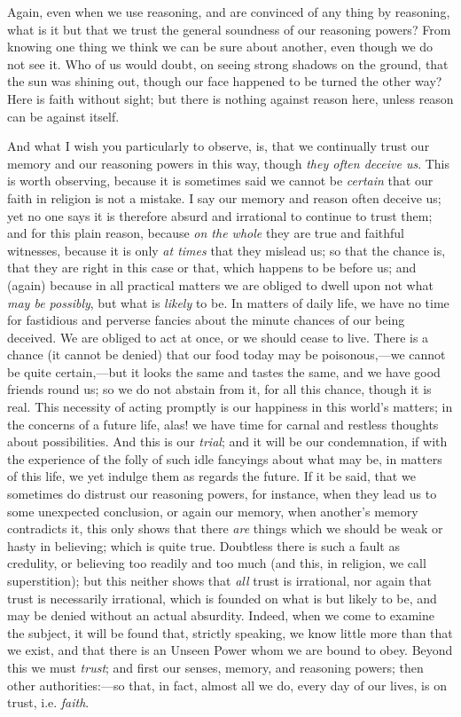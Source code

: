Again, even when we use reasoning, and are convinced
of any thing by reasoning, what is it but that we trust the general soundness of our reasoning powers? From
knowing one thing we think we can be sure about another,
even though we do not see it. Who of us would doubt, on
seeing strong shadows on the ground, that the sun was
shining out, though our face happened to be turned the
other way? Here is faith without sight; but there is
nothing against reason here, unless reason can be against
itself.

And what I wish you particularly to observe, is, that
we continually trust our memory and our reasoning powers
in this way, though \emph{they often deceive us}. This is
worth observing, because it is sometimes said we cannot
be \emph{certain} that our faith in religion is not a
mistake. I say our memory and reason often deceive us;
yet no one says it is therefore absurd and irrational to
continue to trust them; and for this plain reason,
because \emph{on the whole} they are true and faithful
witnesses, because it is only \emph{at times} that they
mislead us; so that the chance is, that they are right in
this case or that, which happens to be before us; and
(again) because in all practical matters we are obliged
to dwell upon not what \emph{may be possibly}, but what
is \emph{likely} to be. In matters of daily life, we have
no time for fastidious and perverse fancies about the
minute chances of our being deceived. We are obliged to
act at once, or we should cease to live. There is a
chance (it cannot be denied) that our food today may be
poisonous,—we cannot be quite certain,—but it
looks the same and tastes the same, and we have good
friends round us; so we do not abstain from it, for all
this chance, though it is real. This necessity of acting
promptly is our happiness in this world's matters; in the
concerns of a future life, alas! we have time for carnal
and restless thoughts about possibilities. And this is
our \emph{trial}; and it will be our condemnation, if
with the experience of the folly of such idle fancyings
about what may be, in matters of this life, we yet
indulge them as regards the future. If it be said, that
we sometimes do distrust our reasoning powers, for
instance, when they lead us to some unexpected
conclusion, or again our memory, when another's memory
contradicts it, this only shows that there \emph{are}
things which we should be weak or hasty in believing;
which is quite true. Doubtless there is such a fault as
credulity, or believing too readily and too much (and
this, in religion, we call superstition); but this
neither shows that \emph{all} trust is irrational, nor
again that trust is necessarily irrational, which is
founded on what is but likely to be, and may be denied
without an actual absurdity. Indeed, when we come to
examine the subject, it will be found that, strictly
speaking, we know little more than that we exist, and
that there is an Unseen Power whom we are bound to obey.
Beyond this we must \emph{trust}; and first our senses,
memory, and reasoning powers; then other
authorities:—so that, in fact, almost all we do,
every day of our lives, is on trust, i.e. \emph{faith}.

